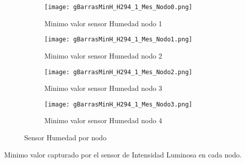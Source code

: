 \documentclass{article}
\begin{document}
        \begin{figure}[h!]
            \centering\begin{subfigure}[h]{0.42\linewidth}
                                    \texttt{[image: gBarrasMinH\_H294\_1\_Mes\_Nodo0.png]}
                                    \caption{Minimo valor sensor Humedad nodo 1}
                                    \label{fig:HumedadMin1}
                                \end{subfigure}
                                \begin{subfigure}[h]{0.42\linewidth}
                                    \texttt{[image: gBarrasMinH\_H294\_1\_Mes\_Nodo1.png]}
                                    \caption{Minimo valor sensor Humedad nodo 2}
                                    \label{fig:HumedadMin2}
                                \end{subfigure}
                                \begin{subfigure}[h]{0.42\linewidth}
                                    \texttt{[image: gBarrasMinH\_H294\_1\_Mes\_Nodo2.png]}
                                    \caption{Minimo valor sensor Humedad nodo 3}
                                    \label{fig:HumedadMin3}
                                \end{subfigure}
                                \begin{subfigure}[h]{0.42\linewidth}
                                    \texttt{[image: gBarrasMinH\_H294\_1\_Mes\_Nodo3.png]}
                                    \caption{Minimo valor sensor Humedad nodo 4}
                                    \label{fig:HumedadMin4}
                                \end{subfigure}
                                \caption{Sensor Humedad por nodo}
            \label{fig:fig8}
        \end{figure}        
        \newline Minimo valor capturado por el sensor de Intensidad Luminosa en cada nodo.
\end{document}
